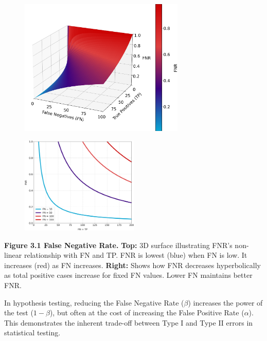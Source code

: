 \begin{figure}[ht!]
    \centering
    \includegraphics[width=0.7\textwidth]{figures/FNR_3d_surface.png}
\end{figure}

\begin{figure}
    \centering
    \vspace{-20pt} %
    \includegraphics[width=0.5\textwidth]{figures/FNR_2d_line_plot.png} %
\end{figure}

\textbf{Figure 3.1 False Negative Rate.} 
\textbf{Top:}
3D surface illustrating FNR's non-linear relationship with FN and TP. FNR is lowest (blue) when FN is low. It increases (red) as FN increases.
\textbf{Right:}
Shows how FNR decreases hyperbolically as total positive cases increase for fixed FN values. Lower FN maintains better FNR.


{
    In hypothesis testing, reducing the False Negative Rate ($\beta$) increases the power of the test ($1 - \beta$), but often at the cost of increasing the False Positive Rate ($\alpha$).
    This demonstrates the inherent trade-off between Type I and Type II errors in statistical testing.
}

